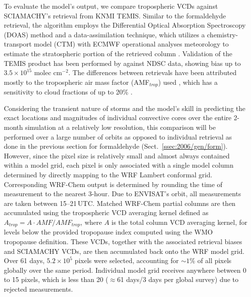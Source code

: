To evaluate the model's output, we compare tropospheric  VCDs against SCIAMACHY's retrieval from
KNMI TEMIS. Similar to the formaldehyde retrieval, the algorithm employs the Differential Optical Absorption Spectroscopy
(DOAS) method and a data-assimilation technique, which utilizes a chemistry-transport model (CTM) with ECMWF
operational analyses meteorology to estimate the stratospheric portion of the retrieved column \citep{Boersma:2004uq}.
Validation of the TEMIS  product has been performed by \citet{Lambert:2004aa} against NDSC data, showing
bias up to $3.5\times10^{15}$ molec cm$^{-2}$. The differences between retrievals have been attributed mostly to the
tropospheric air mass factor (AMF$_{trop}$) used \citep{vanderA:2010aa}, which has a sensitivity to cloud fractions of
up to 20\% \citep{Boersma:2004uq}.


Considering the transient nature of storms and the model's skill in predicting the exact locations and magnitudes of individual
convective cores over the entire 2-month simulation at a relatively low resolution, this comparison will be performed over a large
number of orbits as opposed to individual retrieval as done in the previous section for formaldehyde (Sect.~\ref{ssec:2006/gen/form}).
However, since the pixel size is relatively small and almost always contained within a model grid, each pixel is only associated
with a single model column determined by directly mapping to the WRF Lambert conformal grid. Corresponding
WRF-Chem output is determined by rounding the time of measurement to the nearest 3-hour. Due to ENVISAT's orbit, all
measurements are taken between 15--21\,\unit{UTC}. Matched WRF-Chem  partial columns
are then accumulated using the tropospheric VCD averaging kernel defined as $A_{trop} = A\cdot AMF/AMF_{trop}$, where
$A$ is the total column VCD averaging kernel, for levels below the provided tropopause index computed using the WMO
tropopause definition. These VCDs, together with the associated retrieval biases and SCIAMACHY VCDs,  are then
accumulated back onto the WRF model grid. Over 61 days, $5.2\times10^5$ pixels were selected, accounting for $\sim1\%$
of all pixels globally over the same period. Individual model grid receives anywhere between 0 to 15 pixels, which is less
than 20 ($\approx$61 days/3 days per global survey) due to rejected measurements.

